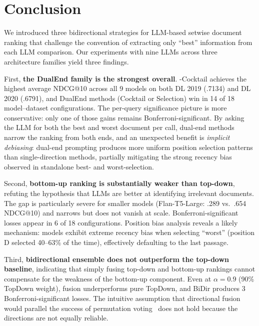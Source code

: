 \section{Conclusion}
\label{sec:conclusion}

We introduced three bidirectional strategies for LLM-based setwise document ranking that challenge the convention of extracting only ``best'' information from each LLM comparison. Our experiments with nine LLMs across three architecture families yield three findings.

First, \textbf{the DualEnd family is the strongest overall}. \dualend{}-Cocktail achieves the highest average NDCG@10 across all 9 models on both DL 2019 (.7134) and DL 2020 (.6791), and DualEnd methods (Cocktail or Selection) win in 14 of 18 model--dataset configurations. The per-query significance picture is more conservative: only one of those gains remains Bonferroni-significant. By asking the LLM for both the best and worst document per call, dual-end methods narrow the ranking from both ends, and an unexpected benefit is \emph{implicit debiasing}: dual-end prompting produces more uniform position selection patterns than single-direction methods, partially mitigating the strong recency bias observed in standalone best- and worst-selection.

Second, \textbf{bottom-up ranking is substantially weaker than top-down}, refuting the hypothesis that LLMs are better at identifying irrelevant documents. The gap is particularly severe for smaller models (Flan-T5-Large: .289 vs.\ .654 NDCG@10) and narrows but does not vanish at scale. Bonferroni-significant losses appear in 6 of 18 configurations. Position bias analysis reveals a likely mechanism: models exhibit extreme recency bias when selecting ``worst'' (position D selected 40--63\% of the time), effectively defaulting to the last passage.

Third, \textbf{bidirectional ensemble does not outperform the top-down baseline}, indicating that simply fusing top-down and bottom-up rankings cannot compensate for the weakness of the bottom-up component. Even at $\alpha=0.9$ (90\% TopDown weight), fusion underperforms pure TopDown, and BiDir produces 3 Bonferroni-significant losses. The intuitive assumption that directional fusion would parallel the success of permutation voting~\citep{tang2024found} does not hold because the directions are not equally reliable.

